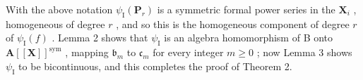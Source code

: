 With the above notation \(\psi_{\mathrm{I}}(\mathbf{P}_{r})\) is a symmetric formal power series in the \(\mathbf{X}_i\) , homogeneous of degree \(r\) , and so this is the homogeneous component of degree \(r\) of \(\psi_{\mathrm{I}}(f)\) . Lemma 2 shows that \(\psi_{\mathrm{I}}\) is an algebra homomorphism of B onto \(\mathbf{A}[[\mathbf{X}]]^{\mathrm{sym}}\) , mapping \(\mathfrak{b}_m\) to \(\mathfrak{c}_m\) for every integer \(m \geqslant 0\) ; now Lemma 3 shows \(\psi_{\mathrm{I}}\) to be bicontinuous, and this completes the proof of Theorem 2.

